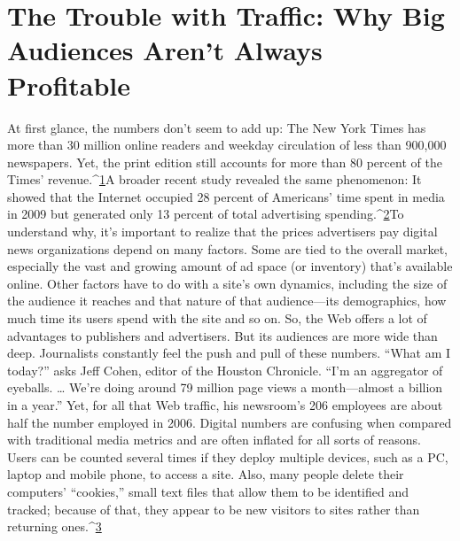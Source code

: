 \chapter{The Trouble with Traffic: Why Big Audiences Aren't Always Profitable}
At first glance, the numbers don't seem to add up: The New York Times
has more than 30 million online readers and weekday circulation of less than
900,000 newspapers. Yet, the print edition still accounts for more than 80 percent
of the Times' revenue.^{\href{#endnotes-chapter-2}{1}}A broader recent study revealed the same phenomenon: It
showed that the Internet occupied 28 percent of Americans' time spent in media
in 2009 but generated only 13 percent of total advertising spending.^{\href{#endnotes-chapter-2}{2}}To understand why, it's important to realize that the prices advertisers pay
digital news organizations depend on many factors. Some are tied to the overall
market, especially the vast and growing amount of ad space (or inventory) that's
available online. Other factors have to do with a site's own dynamics, including
the size of the audience it reaches and that nature of that audience—its demographics,
how much time its users spend with the site and so on.
So, the Web offers a lot of advantages to publishers and advertisers. But its audiences
are more wide than deep.
Journalists constantly feel the push and pull of these numbers. ``What am I
today?'' asks Jeff Cohen, editor of the Houston Chronicle. ``I'm an aggregator
of eyeballs. … We're doing around 79 million page views a month—almost a
billion in a year.'' Yet, for all that Web traffic, his newsroom's 206 employees are
about half the number employed in 2006.
Digital numbers are confusing when compared with traditional media metrics
and are often inflated for all sorts of reasons. Users can be counted several times
if they deploy multiple devices, such as a PC, laptop and mobile phone, to access
a site. Also, many people delete their computers' ``cookies,'' small text files that
allow them to be identified and tracked; because of that, they appear to be new
visitors to sites rather than returning ones.^{\href{#endnotes-chapter-2}{3}}%

